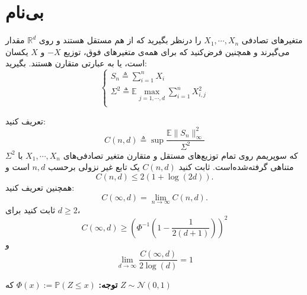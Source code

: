 \section[]{بی‌نام}
متغیرهای تصادفی 
$X_{1},\cdots,X_{n}$
را درنظر بگیرید که از هم مستقل هستند و روی 
$\mathbb{R}^{d}$
 مقدار می‌گیرند و همچنین فرض‌کنید که برای همه‌ی متغیرهای فوق،  توزیع $-X$ و $X$ یکسان است، یا به عبارتی متقارن هستند. بگیرید: 
\begin{equation*}
\begin{cases}
S_{n}\triangleq\sum_{i=1}^{n}X_{i}\\
\Sigma^{2}\triangleq \mathbb{E}\max_{j=1,\cdots,d}\sum_{i=1}^{n}X_{i,j}^{2}\\

\end{cases}
\end{equation*}
 
  تعریف کنید:
  \[
  C(n,d)\triangleq\sup\frac{\mathbb{E}\|S_{n}\|_{\infty}^{2}}{\Sigma^{2}}
  \]
   که سوپریمم روی تمام توزیع‌های مستقل و متقارن متغیر تصادفی‌های 
   $X_{1},\cdots,X_{n}$
   ‌با $\Sigma^{2}$ متناهی گرفته‌شده‌است. ثابت کنید 
   $C(n,d)$
   یک تابع غیر نزولی برحسب $n,d$ است و 
   \[
   C(n,d)\le2(1+\log(2d)).
   \]
   همچنین تعریف کنید:
   \[
   C(\infty,d)=\lim_{n\to\infty}C(n,d).
   \]
   ثابت کنید برای $d\ge2$،
   \[
    C(\infty,d)\ge \left(\Phi^{-1}\left(1-\frac{1}{2(d+1)}\right)\right)^{2}
   \]
    و 
    \[
    \lim_{d\to\infty} \frac{C(\infty,d)}{2\log(d)}=1
    \]
    
    \textbf{    توجه: }
    $\Phi(x):=\mathbb{P}(Z\le x)$
    که 
    $Z\sim\mathcal{N}(0,1)$